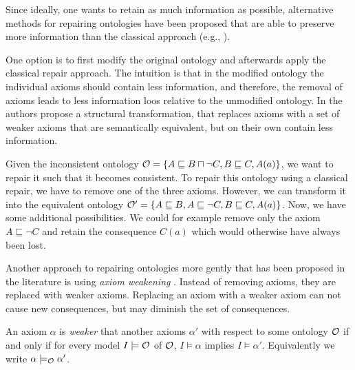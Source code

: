 Since ideally, one wants to retain as much information as possible, alternative methods for repairing ontologies have been proposed that are able to preserve more information than the classical approach (e.g., \cite{du2014practical,AMAI-2018,baader2018making,troquard2018repairing,confalonieri2020towards,horridge2008laconic,lam2008fine}).

One option is to first modify the original ontology and afterwards apply the classical repair approach. The intuition is that in the modified ontology the individual axioms should contain less information, and therefore, the removal of axioms leads to less information loos relative to the unmodified ontology. In \cite{horridge2008laconic} the authors propose a structural transformation, that replaces axioms with a set of weaker axioms that are semantically equivalent, but on their own contain less information.

\begin{example}
  Given the inconsistent ontology $\mathcal{O} = \{ A \sqsubseteq B \sqcap \lnot C, B \sqsubseteq C, A(a) \}$, we want to repair it such that it becomes consistent. To repair this ontology using a classical repair, we have to remove one of the three axioms. However, we can transform it into the equivalent ontology $\mathcal{O}' = \{ A \sqsubseteq B, A \sqsubseteq \lnot C, B \sqsubseteq C, A(a) \}$. Now, we have some additional possibilities. We could for example remove only the axiom $A \sqsubseteq \lnot C$ and retain the consequence $C(a)$ which would otherwise have always been lost.
\end{example}

Another approach to repairing ontologies more gently that has been proposed in the literature is using \emph{axiom weakening} \cite{troquard2018repairing,confalonieri2020towards,confalonieri2022irresistible,baader2018making,lam2008fine}. Instead of removing axioms, they are replaced with weaker axioms. Replacing an axiom with a weaker axiom can not cause new consequences, but may diminish the set of consequences.

\begin{definition}
  An axiom $\alpha$ is \emph{weaker} that another axioms $\alpha'$ with respect to some ontology $\mathcal{O}$ if and only if for every model $I \models \mathcal{O}$ of $\mathcal{O}$, $I \models \alpha$ implies $I \models \alpha'$. Equivalently we write $\alpha \models_\mathcal{O} \alpha'$.
\end{definition}

